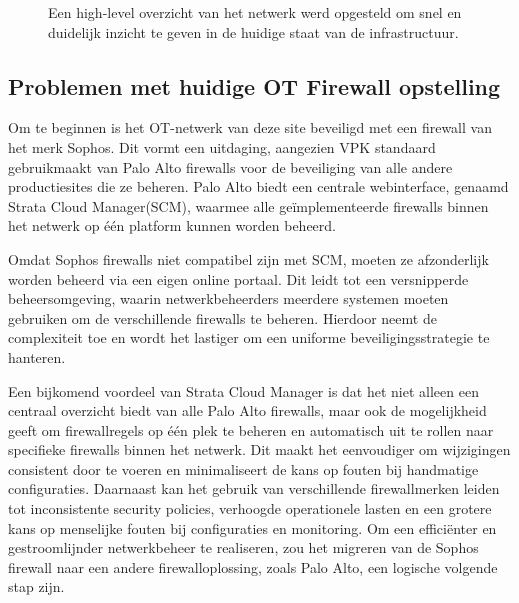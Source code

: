 \begin{figure}[H]
    \centering
    \caption[high-level overzicht]{\label{fig:grail}Een high-level overzicht van het netwerk werd opgesteld om snel en duidelijk inzicht te geven in de huidige staat van de infrastructuur.}
\end{figure}


\subsection{Problemen met huidige OT Firewall opstelling}
Om te beginnen is het OT-netwerk van deze site beveiligd met een firewall van het merk Sophos. Dit vormt een uitdaging, aangezien VPK standaard gebruikmaakt van Palo Alto firewalls voor de beveiliging van alle andere productiesites die ze beheren. Palo Alto biedt een centrale webinterface, genaamd Strata Cloud Manager(SCM), waarmee alle geïmplementeerde firewalls binnen het netwerk op één platform kunnen worden beheerd.

Omdat Sophos firewalls niet compatibel zijn met SCM, moeten ze afzonderlijk worden beheerd via een eigen online portaal. Dit leidt tot een versnipperde beheersomgeving, waarin netwerkbeheerders meerdere systemen moeten gebruiken om de verschillende firewalls te beheren. Hierdoor neemt de complexiteit toe en wordt het lastiger om een uniforme beveiligingsstrategie te hanteren.

Een bijkomend voordeel van Strata Cloud Manager is dat het niet alleen een centraal overzicht biedt van alle Palo Alto firewalls, maar ook de mogelijkheid geeft om firewallregels op één plek te beheren en automatisch uit te rollen naar specifieke firewalls binnen het netwerk. Dit maakt het eenvoudiger om wijzigingen consistent door te voeren en minimaliseert de kans op fouten bij handmatige configuraties.
Daarnaast kan het gebruik van verschillende firewallmerken leiden tot inconsistente security policies, verhoogde operationele lasten en een grotere kans op menselijke fouten bij configuraties en monitoring. Om een efficiënter en gestroomlijnder netwerkbeheer te realiseren, zou het migreren van de Sophos firewall naar een andere firewalloplossing, zoals Palo Alto, een logische volgende stap zijn.

